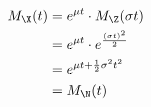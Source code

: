 \message{ !name(z-n-transform.tex)}\documentclass{article}
\begin{document}
\begin{align*}
M_{\X}(t) & = e^{\mu t} \cdot M_{\Z}(\sigma t) \\
& = e^{\mu t} \cdot e^{\frac{(\sigma t)^2}{2}} \\
& = e^{\mu t + \frac{1}{2}\sigma^2t^2} \\
& = M_{\N}(t)
\end{align*}
\end{document}
